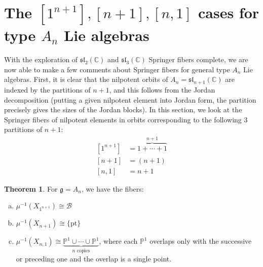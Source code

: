\documentclass[11pt]{article}
\newcommand{\C}{\mathbb{C}}
\newcommand{\bP}{\mathbb{P}}
\theoremstyle{definition}
\newtheorem{theorem}[equation]{Theorem}
\numberwithin{equation}{section} %
\begin{document}
\section{The $\left[1^{n+1}\right], [n+1], [n,1]$ cases for type $A_n$ Lie algebras}
With the exploration of $\mathfrak{sl}_2(\C)$ and $\mathfrak{sl}_3(\C)$ Springer fibers complete, we are now able to make a few comments about Springer fibers for general type $A_n$ Lie algebras. First, it is clear that the nilpotent orbits of $A_n = \mathfrak{sl}_{n+1}(\C)$ are indexed by the partitions of $n+1$, and this follows from the Jordan decomposition (putting a given nilpotent element into Jordan form, the partition precisely gives the sizes of the Jordan blocks). In this section, we look at the Springer fibers of nilpotent elements in orbits corresponding to the following 3 partitions of $n+1$:
\begin{align*}
    \left[1^{n+1}\right] &= \overbrace{1+\cdots +1}^{n+1} \\
    [n+1] &= (n+1) \\
    [n,1] &= n+1
\end{align*} 

\begin{theorem}
    For $\mathfrak{g} = A_n$, we have the fibers:
    \begin{enumerate}[(a)]
        \item $\mu^{-1}\left(X_{1^{n+1}}\right) \cong \mathcal{B}$
        \item $\mu^{-1}\left(X_{n+1}\right) \cong \{\text{pt}\}$
        \item $\mu^{-1}\left(X_{n,1}\right) \cong \underbrace{\bP^1\cup\cdots \cup\bP^1}_{n\text{ copies}}$, where each $\bP^1$ overlaps only with the successive or preceding one and the overlap is a single point.
    \end{enumerate}
\end{theorem}
\end{document}
